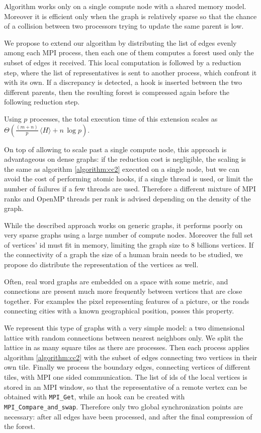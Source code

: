 Algorithm \label{algorithm:cc2} works only on a single compute node with a shared memory model. Moreover it is efficient
only when the graph is relatively sparse so that the chance of a collision between two processors trying to update the same parent is low.

We propose to extend our algorithm by distributing the list of edges evenly among each MPI process,
then each one of them computes a forest used only the subset of edges it received. This local computation
is followed by a reduction step, where the list of representatives is sent to another process, which confront it
with its own. If a discrepancy is detected, a hook is inserted between the two different parents, then
the resulting forest is compressed again before the following reduction step.

Using $p$ processes, the total execution time of this extension scales as $\Theta(\frac{(m + n)}{p}\, \langle H \rangle + n\,\log p)$.

On top of allowing to scale past a single compute node, this approach is advantageous on
dense graphs: if the reduction cost is negligible, the scaling is the same as algorithm \ref{algorithm:cc2} executed on a single node,
but we can avoid the cost of performing atomic hooks, if a single thread is used, or limit the number of failures if a few threads are used.
Therefore a different mixture of MPI ranks and OpenMP threads per rank is advised depending on the density of the graph.

While the described approach works on generic graphs, it performs poorly on very sparse graphs using
a large number of compute nodes. Moreover the full set of vertices' id must fit in memory, limiting the
graph size to $8$ billions vertices. If the connectivity of a graph the size of a human brain needs to be studied,
we propose do distribute the representation of the vertices as well.

Often, real word graphs are embedded on a space with some metric, and connections are present much more frequently between
vertices that are close together. For examples the pixel representing features of a picture, or the roads connecting cities
with a known geographical position, posses this property.

We represent this type of graphs with a very simple model: a two dimensional lattice with random connections between nearest neighbors
only. We split the lattice in as many square tiles as there are processes. Then each process applies algorithm \ref{algorithm:cc2} with the subset
of edges connecting two vertices in their own tile. Finally we process the boundary edges, connecting vertices of different tiles, with MPI
one sided communication. The list of ids of the local vertices is stored in an MPI window, so that the representative of a remote vertex
can be obtained with \verb|MPI_Get|, while an hook can be created with \verb|MPI_Compare_and_swap|.
Therefore only two global synchronization points are necessary: after all edges have been processed, and after the final compression
of the forest.

